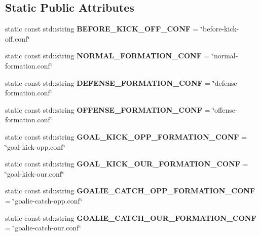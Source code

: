 \subsection*{Static Public Attributes}
\begin{DoxyCompactItemize}
\item 
\hypertarget{classStrategy_a6a5c18973819cdf83bf626e6a925adda}{
static const std::string {\bfseries BEFORE\_\-KICK\_\-OFF\_\-CONF} = \char`\"{}before-\/kick-\/off.conf\char`\"{}}
\label{classStrategy_a6a5c18973819cdf83bf626e6a925adda}

\item 
\hypertarget{classStrategy_a44c758b496f2a6641a081b922d741b2f}{
static const std::string {\bfseries NORMAL\_\-FORMATION\_\-CONF} = \char`\"{}normal-\/formation.conf\char`\"{}}
\label{classStrategy_a44c758b496f2a6641a081b922d741b2f}

\item 
\hypertarget{classStrategy_aba6ec73bfe445b1cd7214a56bfd711ee}{
static const std::string {\bfseries DEFENSE\_\-FORMATION\_\-CONF} = \char`\"{}defense-\/formation.conf\char`\"{}}
\label{classStrategy_aba6ec73bfe445b1cd7214a56bfd711ee}

\item 
\hypertarget{classStrategy_affdd652a46eab297bc5f47ddcb18c678}{
static const std::string {\bfseries OFFENSE\_\-FORMATION\_\-CONF} = \char`\"{}offense-\/formation.conf\char`\"{}}
\label{classStrategy_affdd652a46eab297bc5f47ddcb18c678}

\item 
\hypertarget{classStrategy_a0924312bf675c5c456d7f2439d7f707a}{
static const std::string {\bfseries GOAL\_\-KICK\_\-OPP\_\-FORMATION\_\-CONF} = \char`\"{}goal-\/kick-\/opp.conf\char`\"{}}
\label{classStrategy_a0924312bf675c5c456d7f2439d7f707a}

\item 
\hypertarget{classStrategy_abab666aace1367c066767138d5727355}{
static const std::string {\bfseries GOAL\_\-KICK\_\-OUR\_\-FORMATION\_\-CONF} = \char`\"{}goal-\/kick-\/our.conf\char`\"{}}
\label{classStrategy_abab666aace1367c066767138d5727355}

\item 
\hypertarget{classStrategy_aeadd7f63fd62fba7dc94ef6ae6b41f1f}{
static const std::string {\bfseries GOALIE\_\-CATCH\_\-OPP\_\-FORMATION\_\-CONF} = \char`\"{}goalie-\/catch-\/opp.conf\char`\"{}}
\label{classStrategy_aeadd7f63fd62fba7dc94ef6ae6b41f1f}

\item 
\hypertarget{classStrategy_af3aeda8f1e23fe85a2ce2747bc4eced4}{
static const std::string {\bfseries GOALIE\_\-CATCH\_\-OUR\_\-FORMATION\_\-CONF} = \char`\"{}goalie-\/catch-\/our.conf\char`\"{}}
\label{classStrategy_af3aeda8f1e23fe85a2ce2747bc4eced4}


\end{DoxyCompactItemize}
